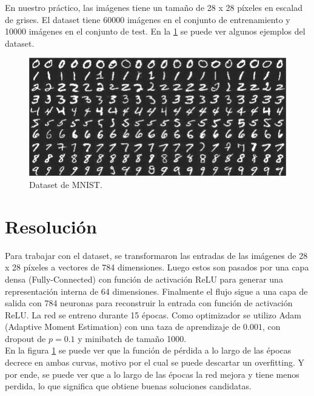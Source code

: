 \documentclass{article}
\begin{document}
En nuestro práctico, las imágenes tiene un tamaño de 28 x 28 píxeles en escalad de grises. El dataset tiene 60000 imágenes en el conjunto de entrenamiento y 10000 imágenes en el conjunto de test.
En la \ref{fig1} se puede ver algunos ejemplos del dataset.
\begin{figure}[H]
\centering
\includegraphics[width=\textwidth]{example.png}
\caption{Dataset de MNIST.}
\label{fig1}
\end{figure}




\section*{Resolución}

Para trabajar con el dataset, se transformaron las entradas de las imágenes de 28 x 28 píxeles a vectores de 784 dimensiones. Luego estos son pasados por una capa densa (Fully-Connected) con función de activación ReLU para generar una representación interna de 64 dimensiones. Finalmente el flujo sigue a una capa de salida con 784 neuronas para reconstruir la entrada con función de activación ReLU.
La red se entreno durante 15 épocas. Como optimizador se utilizo Adam (Adaptive Moment Estimation) con una taza de aprendizaje de $0.001$, con dropout de $p= 0.1$ y minibatch de tamaño 1000.
\\

En la figura \ref{fig1} se puede ver que la función de pérdida a lo largo de las épocas decrece en ambas curvas, motivo por el cual se puede descartar un overfitting. Y por ende, se puede ver que a lo largo de las épocas la red mejora y tiene menos perdida, lo que significa que obtiene buenas soluciones candidatas.
\end{document}
